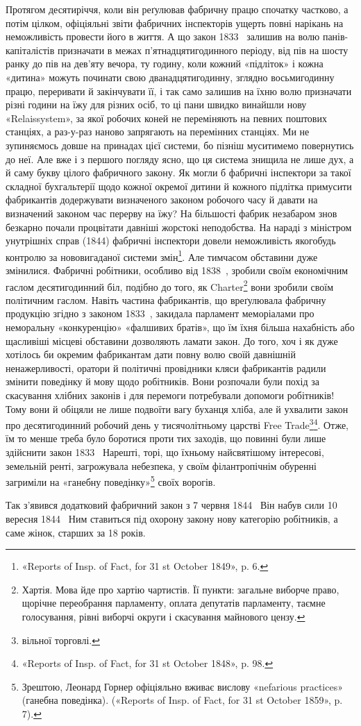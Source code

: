 Протягом десятиріччя, коли він реґулював фабричну працю
спочатку частково, а потім цілком, офіціяльні звіти фабричних
інспекторів ущерть повні нарікань на неможливість провести його
в життя. А що закон 1833~ залишив на волю панів-капіталістів
призначати в межах п’ятнадцятигодинного періоду, від пів на шосту
ранку до пів на дев’яту вечора, ту годину, коли кожний «підліток»
і кожна «дитина» можуть починати свою дванадцятигодинну,
зглядно восьмигодинну працю, переривати й закінчувати
її, і так само залишив на їхню волю призначати різні години
на їжу для різних осіб, то ці пани швидко винайшли нову
«Relaissystem», за якої робочих коней не переміняють на певних
поштових станціях, а раз-у-раз наново запрягають на перемінних
станціях. Ми не зупиняємось довше на принадах цієї
системи, бо пізніш муситимемо повернутись до неї. Але вже і з
першого погляду ясно, що ця система знищила не лише дух, а й
саму букву цілого фабричного закону. Як могли б фабричні
інспектори за такої складної бухгальтерії щодо кожної окремої
дитини й кожного підлітка примусити фабрикантів додержувати
визначеного законом робочого часу й давати на визначений законом
час перерву на їжу? На більшості фабрик незабаром знов
безкарно почали процвітати давніші жорстокі неподобства.
На нараді з міністром унутрішніх справ (1844) фабричні інспектори
довели неможливість якогобудь контролю за нововигаданої
системи змін\footnote{
«Reports of Insp. of Fact, for 31 st October 1849», p. 6.
}. Але тимчасом обставини дуже змінилися. Фабричні
робітники, особливо від 1838~, зробили своїм економічним гаслом
десятигодинний біл, подібно до того, як Charter\footnote*{
Хартія. Мова йде про хартію чартистів. Її пункти: загальне виборче
право, щорічне переобрання парламенту, оплата депутатів парламенту,
таємне голосування, рівні виборчі округи і скасування майнового
цензу. 
} вони зробили своїм
політичним гаслом. Навіть частина фабрикантів, що вреґулювала
фабричну продукцію згідно з законом 1833~, закидала парламент
меморіалами про неморальну «конкуренцію» «фалшивих братів»,
що їм їхня більша нахабність або щасливіші місцеві обставини
дозволяють ламати закон. До того, хоч і як дуже хотілось би
окремим фабрикантам дати повну волю своїй давнішній ненажерливості,
оратори й політичні провідники кляси фабрикантів радили
змінити поведінку й мову щодо робітників. Вони розпочали
були похід за скасування хлібних законів і для перемоги потребували
допомоги робітників! Тому вони й обіцяли не лише подвоїти
вагу буханця хліба, але й ухвалити закон про десятигодинний
робочий день у тисячолітньому царстві Free Trade\footnote*{
вільної торговлі. 
}\footnote{
«Reports of Insp. of Fact, for 31 st October 1848», p. 98.
}. Отже, їм то менше треба було боротися проти тих заходів, що
повинні були лише здійснити закон 1833~ Нарешті, торі, що їхньому
найсвятішому інтересові, земельній ренті, загрожувала
небезпека, у своїм філантропічнім обуренні загриміли на «ганебну
поведінку»\footnote{
Зрештою, Леонард Горнер офіціяльно вживає вислову «nefarious
practices» (ганебна поведінка). («Reports of Insp. of Fact, for 31 st
October 1859», p. 7).
} своїх ворогів.

Так з’явився додатковий фабричний закон з 7 червня 1844~
Він набув сили 10 вересня 1844~ Ним ставиться під охорону закону
нову категорію робітників, а саме жінок, старших за 18 років.
\parbreak{}  %
